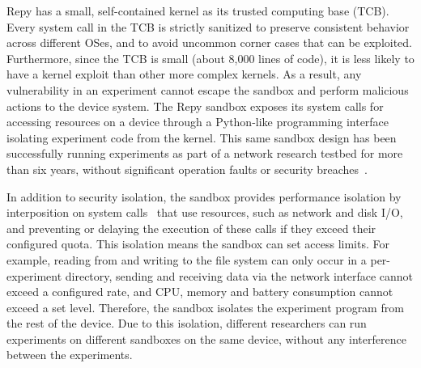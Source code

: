 Repy has a small, self-contained kernel as its trusted 
computing base (TCB). %
Every system call in the TCB is strictly 
sanitized to preserve consistent behavior across different OSes, 
and to avoid uncommon corner cases that can be exploited. 
Furthermore, since the TCB is small (about 8,000 lines of code), it is 
less likely to have a kernel exploit than other more complex kernels. 
As a result, any vulnerability in an experiment 
cannot escape the sandbox and perform malicious actions to 
the device system. The Repy sandbox exposes its system calls for 
accessing resources on a device through a Python-like programming 
interface~\cite{repyv2} isolating experiment code from the kernel. 
This same sandbox design has been successfully running experiments as part of a network research 
testbed for more than six years, without significant operation faults or security breaches~\cite{seattle}.  

In addition to security isolation,
the sandbox provides performance isolation by
interposition on system calls~\cite{garfinkel2003traps} that 
use resources, such as network and disk I/O, and preventing 
or delaying the execution of these calls if they exceed 
their configured quota. 
This isolation means the sandbox can set access limits. For example, 
reading from and writing to the file system can
only occur in a per-experiment directory, sending and receiving
data via the network interface cannot exceed a configured rate, and 
CPU, memory and battery consumption cannot exceed a set level.
Therefore, the sandbox isolates the experiment program from 
the rest of the device. Due to this isolation, different researchers 
can run experiments on different sandboxes on the same device, 
without any interference between the experiments.

